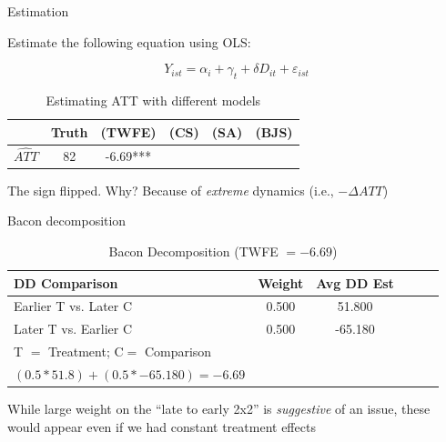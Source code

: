 \documentclass{beamer}
\begin{document}
\begin{frame}{Estimation}

\bigskip

Estimate the following equation using OLS:

$$Y_{ist} = \alpha_i + \gamma_t +\delta D_{it} + \varepsilon_{ist}$$


\begin{table}[htbp]\centering
\small
\caption{Estimating ATT with different models}
\begin{center}
\begin{tabular}{l*{5}{c}}
\hline
\multicolumn{1}{l}{\textbf{}}&
\multicolumn{1}{c}{\textbf{Truth}}&
\multicolumn{1}{c}{\textbf{(TWFE)}}&
\multicolumn{1}{c}{\textbf{(CS)}}&
\multicolumn{1}{c}{\textbf{(SA)}}&
\multicolumn{1}{c}{\textbf{(BJS)}}\\
\hline
$\widehat{ATT}$  & 82    & -6.69*** &&&\\
\hline
\end{tabular}
\end{center}
\end{table}

The sign flipped.  Why?  Because of \emph{extreme} dynamics (i.e., $- \Delta ATT$)

\end{frame}

\begin{frame}{Bacon decomposition}
\begin{table}[htbp]\centering
\small
\caption{Bacon Decomposition (TWFE $= -6.69$)}
\begin{center}
\begin{tabular}{l*{5}{c}}
\hline
\multicolumn{1}{l}{\textbf{DD Comparison}}&
\multicolumn{1}{l}{\textbf{Weight}}&
\multicolumn{1}{l}{\textbf{Avg DD Est}}\\
\hline
Earlier T vs. Later C  &     0.500   &       51.800 \\
Later T vs. Earlier C   &    0.500    &     -65.180 \\
\midrule
T $=$ Treatment; C$ =$ Comparison \\
$(0.5*51.8) + (0.5*-65.180) = -6.69$ \\
\hline
\end{tabular}
\end{center}
\end{table}

\bigskip

While large weight on the ``late to early 2x2'' is \emph{suggestive} of an issue, these would appear even if we had constant treatment effects

\end{frame}
\end{document}
